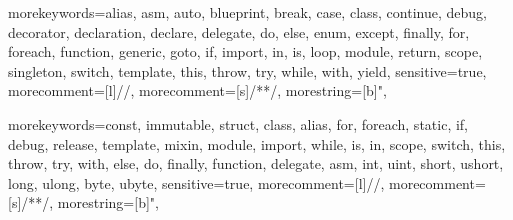 
\newcommand{\grDef}[1]{\rule{0mm}{5mm}\refstepcounter{grammarRule}\label{gr:#1}#1&::=&}
\newcommand{\tokenDef}[1]{\refstepcounter{grammarRule}\label{tok:#1}#1:&&}
\newcommand{\grAltLn}{&&| }
\newcommand{\grLn}{&&\hspace{1cm}}

\newcommand{\gr}[1]{\hyperref[gr:#1]{\texttt{#1}}}
\newcommand{\kwd}[1]{'\textbf{\texttt{#1}}'}
\newcommand{\token}[1]{\hyperref[tok:#1]{\textit{\texttt{#1}}}}
\newcommand{\typeRef}[1]{\hyperref[type:#1]{\texttt{#1}}}

\newcommand{\decoratorRef}[1]{\hyperref[decorator:#1]{\texttt{@#1}}}
\newcommand{\decorationContextRef}[1]{\hyperref[decorationContexts]{\texttt{#1}}}
\newcommand{\enumRef}[1]{\hyperref[enum:#1]{\texttt{#1}}}

\newcommand{\moduleSep}{/* - - - - - - - - DIFFERENT MODULE - - - - - - - - */}


{
	morekeywords={alias, asm, auto, blueprint, break, case, class, continue, debug, decorator, declaration, declare, delegate, do, else, enum, except, finally, for, foreach, function, generic, goto, if, import, in, is, loop, module, return, scope, singleton, switch, template, this, throw, try, while, with, yield},
	sensitive=true,
	morecomment=[l]{//},
	morecomment=[s]{/*}{*/},
	morestring=[b]",
}
\newcommand{\inlineCode}[1]{\lstinline[%
	language=nati,
	keepspaces,
	breakatwhitespace=true,
	breaklines=true
	]{#1}}

{
	morekeywords={const, immutable, struct, class, alias, for, foreach, static, if, debug, release, template, mixin, module, import, while, is, in, scope, switch, this, throw, try, with, else, do, finally, function, delegate, asm, int, uint, short, ushort, long, ulong, byte, ubyte},
	sensitive=true,
	morecomment=[l]{//},
	morecomment=[s]{/*}{*/},
	morestring=[b]",
}
\newcommand{\inlineDCode}[1]{\lstinline[%
	language=d,
	keepspaces,
	breakatwhitespace=true,
	breaklines=true
	]{#1}}

\newcommand{\inlineCppCode}[1]{\lstinline[%
	language=c++,
	keepspaces,
	breakatwhitespace=true,
	breaklines=true
	]{#1}}
